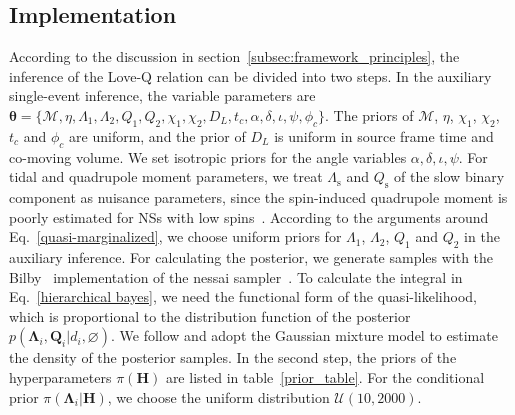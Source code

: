 \documentclass[a4paper,11pt]{article}
\begin{document}
\subsection{Implementation}
\label{subsec:simulation_implementation}

According to the discussion in section~\ref{subsec:framework_principles}, the inference of the Love-Q relation
can be divided into two steps.
In the auxiliary single-event inference, the variable parameters are $\bm{\theta} = \{\mathcal{M},\eta,
\Lambda_1,\Lambda_2,Q_1,Q_2,\chi_1,\chi_2,D_L,t_{c},\alpha,\delta,\iota,\psi,\phi_{c}\}
$. The priors of $\mathcal{M}$, $\eta$, $\chi_1$, $\chi_2$, $t_{c}$ and $\phi_{c}$ are uniform, and
the prior of $D_L$ is uniform in source frame time and co-moving volume. We 
set isotropic priors for the angle variables $\alpha,\delta,\iota,\psi$. For tidal 
and quadrupole moment parameters, we treat $\Lambda_{\mathrm{s}}$ and $Q_{\mathrm{s}}$ of the slow 
binary component as nuisance parameters, since the spin-induced 
quadrupole moment is poorly estimated for NSs with low spins~\cite{Yagi:2013awa}.
According to the arguments around Eq.~\eqref{quasi-marginalized}, we choose
uniform priors for $\Lambda_1$, $\Lambda_2$, $Q_1$ and $Q_2$ in the auxiliary inference.
For calculating the posterior, we generate samples with the {\sc
Bilby}~\cite{Ashton:2018jfp} implementation of the {\sc nessai}
sampler~\cite{Skilling:2004pqw,Skilling:2006gxv,michael_j_williams_2025_14627250,PhysRevD.103.103006,Williams:2023ppp}.
To calculate the integral in Eq.~\eqref{hierarchical bayes}, we need the
functional form of the quasi-likelihood, which is proportional to the
distribution function of the posterior
$p(\bm{\Lambda}_i,\bm{Q}_i|d_i,\varnothing)$. We follow
\citet{Golomb:2021tll} and adopt the Gaussian mixture 
model to estimate the density of the posterior samples.
In the second step, the priors of the hyperparameters $\pi(\bm{H})$ are listed
in table~\ref{prior_table}. For the conditional prior $\pi(\bm
{\Lambda}_i|\bm{H})$, we choose the uniform distribution $\mathcal{U}(10,2000)$. 
\end{document}
